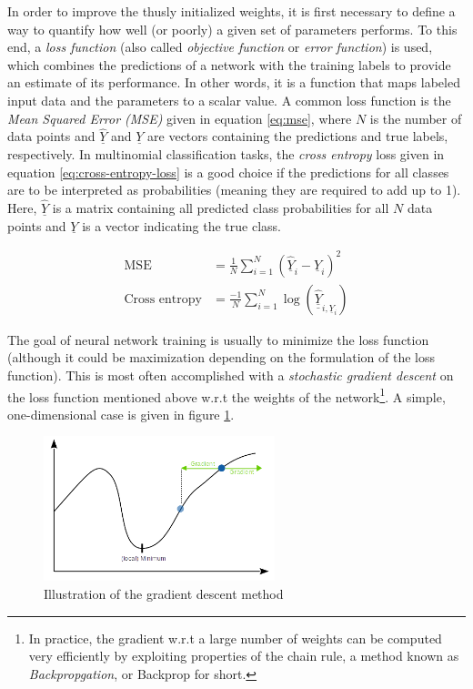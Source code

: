 \documentclass[11pt, a4paper]{article}
\newcommand\braces[1]{\left(#1\right)}
\renewcommand{\vec}[1]{\underline{#1}}
\newcommand{\mat}[1]{\underline{\underline{#1}}}
\begin{document}
In order to improve the thusly initialized weights, it is first necessary to define a way to quantify how well (or poorly) a given set of parameters performs. To this end, a \emph{loss function} (also called \emph{objective function} or \emph{error function}) is used, which combines the predictions of a network with the training labels to provide an estimate of its performance. In other words, it is a function that maps labeled input data and the parameters to a scalar value. A common loss function is the \emph{Mean Squared Error (MSE)} given in equation \eqref{eq:mse}, where $N$ is the number of data points and $\vec{\hat Y}$ and $\vec{Y}$ are vectors containing the predictions and true labels, respectively. In multinomial classification tasks, the \emph{cross entropy} loss given in equation \eqref{eq:cross-entropy-loss} \cite{caffe-cross-entropy} is a good choice if the predictions for all classes are to be interpreted as probabilities (meaning they are required to add up to 1). Here, $\vec{\hat Y}$ is a matrix containing all predicted class probabilities for all $N$ data points and $\vec{Y}$ is a vector indicating the true class.

\begin{align}
	\text{MSE} &= \frac{1}{N} \sum_{i=1}^N \braces{\vec{\hat Y}_i - \vec{Y}_i}^2 \label{eq:mse} \\
	\text{Cross entropy} &= \frac{-1}{N} \sum_{i=1}^N \log{\braces{\mat{\hat Y}_{i, \vec{Y}_i}}} \label{eq:cross-entropy-loss}
\end{align}

The goal of neural network training is usually to minimize the loss function (although it could be maximization depending on the formulation of the loss function). This is most often accomplished with a \emph{stochastic gradient descent} \cite{stochastic-gradient-descent-learning-neural-networks} on the loss function mentioned above w.r.t the weights of the network\footnote{In practice, the gradient w.r.t a large number of weights can be computed very efficiently by exploiting properties of the chain rule, a method known as \emph{Backpropgation}, or Backprop for short.}. A simple, one-dimensional case is given in figure \ref{fig:gradient-descent}.

\begin{figure}[h!tb]
	\centering
	\includegraphics[width=0.6\textwidth]{images/gradient_descent.png}
	\caption[Gradient descent method]{Illustration of the gradient descent method}
	\label{fig:gradient-descent}
\end{figure}
\end{document}
